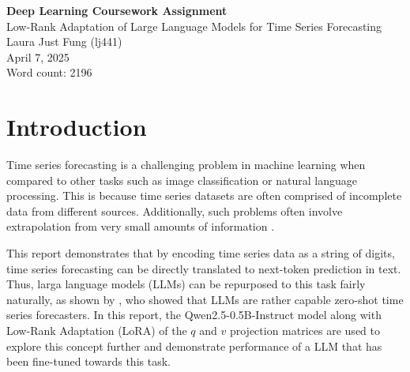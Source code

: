 \documentclass[11pt,a4paper]{article}
\begin{document}
 

\begin{center}
    \LARGE{\textbf{Deep Learning Coursework Assignment}}
    \\
    \Large{{Low-Rank Adaptation of Large Language Models for Time Series Forecasting}}
    \\
    \large{Laura Just Fung (lj441)}
    \\
    April 7, 2025
    \\
    Word count: 2196
\end{center}

\section{Introduction}
Time series forecasting is a challenging problem in machine learning when compared to other tasks such as image classification or natural language processing. This is because time series datasets are often comprised of incomplete data from different sources. Additionally, such problems often involve extrapolation from very small amounts of information \citep{gruver2024largelanguagemodelszeroshot}.

This report demonstrates that by encoding time series data as a string of digits, time series forecasting can be directly translated to next-token prediction in text. Thus, larga language models (LLMs) can be repurposed to this task fairly naturally, as shown by \citeauthor{gruver2024largelanguagemodelszeroshot}, who showed that LLMs are rather capable zero-shot time series forecasters. In this report, the Qwen2.5-0.5B-Instruct model \citep{yang2024qwen2technicalreport} along with Low-Rank Adaptation (LoRA) of the $q$ and $v$ projection matrices are used to explore this concept further and demonstrate performance of a LLM that has been fine-tuned towards this task.
\end{document}
